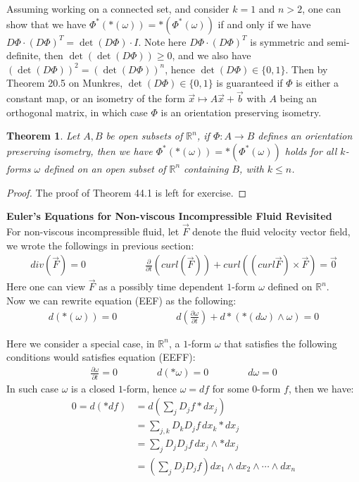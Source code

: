 \documentclass[15pt]{book}
\theoremstyle{break}
\theoremstyle{break}
\newtheorem{thm}{Theorem}[section]
\newcommand{\R}{\mathbb{R}}
\begin{document}
Assuming working on a connected set, and consider $k=1$ and $n>2$, one can show that we have $\Phi^*(*(\omega)) = *(\Phi^*(\omega))$ if and only if we have $D\Phi \cdot (D\Phi)^T = \det(D\Phi) \cdot I$. Note here $D\Phi \cdot (D\Phi)^T$ is symmetric and semi-definite, then $\det(\det(D\Phi)) \geq 0$, and we also have $(\det(D\Phi))^2= (\det(D\Phi))^n$, hence $\det(D\Phi) \in \{0,1\}$. Then by Theorem 20.5 on Munkres, $\det(D\Phi) \in \{0,1\}$ is guaranteed if $\Phi $ is either a constant map, or an isometry of the form $\vec{x}\mapsto A \vec{x}+ \vec{b}$ with $A$ being an orthogonal matrix, in which case $\Phi$ is an orientation preserving isometry. 

\begin{thm}
Let $A, B$ be open subsets of $\R^n$, if $\Phi:A \to B$ defines an orientation preserving isometry, then we have $\Phi^*(*(\omega)) = *(\Phi^*(\omega))$ holds for all $k$-forms $\omega$ defined on an open subset of $\R^n$ containing $B$, with $k\leq n$.
\end{thm}

\begin{proof}
The proof of Theorem 44.1 is left for exercise.
\end{proof}

\textbf{Euler's Equations for Non-viscous Incompressible Fluid Revisited}\\ For non-viscous incompressible fluid, let $\vec{F}$ denote the fluid velocity vector field, we wrote the followings in previous section: 
\begin{align*}
div(\vec{F}) = 0\qquad\qquad\qquad \frac{\partial}{\partial t}(curl(\vec{F})) + curl((curl \vec{F})\times \vec{F}) = \vec{0} \tag{EEF}
\end{align*}
Here one can view $\vec{F}$ as a possibly time dependent $1$-form $\omega$ defined on $\R^n$. \\
Now we can rewrite equation (EEF) as the following: 
\begin{align*}
d(*(\omega)) = 0 \qquad\qquad\qquad d\left( \frac{\partial \omega}{\partial t}\right) + d*(*(d\omega)\wedge \omega) = 0 \tag{EEFF}
\end{align*}


Here we consider a special case, in $\R^n$, a $1$-form $\omega$ that satisfies the following conditions would satisfies equation (EEFF):
\begin{align*}
\frac{\partial \omega}{\partial t} = 0 \qquad \qquad 
d(*\omega) = 0 \qquad \qquad 
d\omega = 0
\end{align*}
In such case $\omega$ is a closed $1$-form, hence $\omega = df$ for some $0$-form $f$, then we have: 
\begin{align*}
0 = d(*df) &=d\left( \sum_j D_j f * dx_j\right) \\
&= \sum_{j,k}D_k D_j f\, dx_k * dx_j \\
&= \sum_j D_j D_j f\, dx_j \wedge * dx_j\\
&= \left(\sum_j D_j D_j f\right) dx_1 \wedge dx_2 \wedge \cdots \wedge dx_n 
\end{align*}
\end{document}
